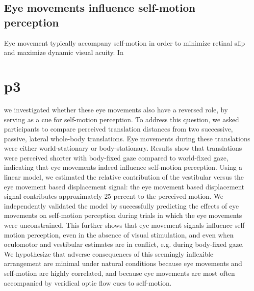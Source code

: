 \section{Eye movements influence self-motion perception}
Eye movement typically accompany self-motion in order to minimize retinal slip and maximize dynamic visual acuity. In \chapter{p3} we investigated whether these eye movements also have a reversed role, by serving as a cue for self-motion perception. To address this question, we asked participants to compare perceived translation distances from two successive, passive, lateral whole-body translations. Eye movements during these translations were either world-stationary or body-stationary. Results show that translations were perceived shorter with body-fixed gaze compared to world-fixed gaze, indicating that eye movements indeed influence self-motion perception. Using a linear model, we estimated the relative contribution of the vestibular versus the eye movement based displacement signal: the eye movement based displacement signal  contributes approximately 25 percent to the perceived motion. We independently validated the model by successfully predicting the effects of eye movements on self-motion perception during trials in which the eye movements were unconstrained. This further shows that eye movement signals influence self-motion perception, even in the absence of visual stimulation, and even when oculomotor and vestibular estimates are in conflict, e.g. during body-fixed gaze. We hypothesize that adverse consequences of this seemingly inflexible arrangement are minimal under natural conditions because eye movements and self-motion are highly correlated, and because eye movements are most often accompanied by veridical optic flow cues to self-motion.

